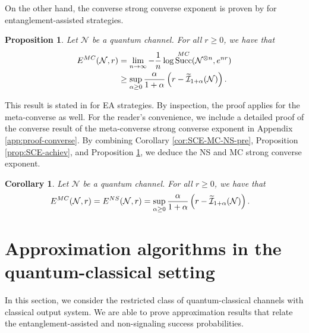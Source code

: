 \documentclass[a4paper,onecolumn,11pt,accepted=2025-10-01]{quantumarticle}
\newtheorem{prop}[theorem]{Proposition}
\newtheorem{cor}[theorem]{Corollary}
\DeclareMathOperator{\suc}{Succ}
\newcommand*{\cI}{\mathcal{I}}
\newcommand*{\cN}{\mathcal{N}}
\begin{document}
On the other hand, the converse strong converse exponent is proven by \cite{Gupta2015Mar} for entanglement-assisted strategies.

\begin{prop}\label{prop:SCE-converse}
     Let  $\cN$ be a quantum channel. For all $r\ge 0$, we have  that
 \begin{align}
     E^{\rm{MC}}(\cN, r) &= \lim_{n\rightarrow \infty } - \frac{1}{n}\log \suc^{\rm{MC}}(\cN^{\otimes n}, e^{nr})  
     \\&\ge \sup_{\alpha\ge 0}  \frac{\alpha}{1+\alpha}\left( r- \widetilde{\cI}_{1+\alpha}(\cN) \right). 
    \end{align}
\end{prop}

This result is stated in \cite{Gupta2015Mar} for EA strategies. By inspection, the proof applies for the meta-converse as well. For the reader's convenience, we include a detailed proof of the converse result of the  meta-converse  strong converse exponent  in Appendix \ref{app:proof-converse}. By combining Corollary \ref{cor:SCE-MC-NS-pre}, Proposition \ref{prop:SCE-achiev}, and Proposition \ref{prop:SCE-converse}, we deduce the  NS and MC strong converse  exponent.

\begin{cor}\label{cor:SCE-MC-NS}
Let $\cN$ be a quantum channel. For all $r\ge 0$, we have  that 
 \begin{align}
     E^{\rm{MC}}(\cN, r) &= E^{\rm{NS}}(\cN, r)
     =\sup_{\alpha\ge 0}  \frac{\alpha}{1+\alpha}\left( r- \widetilde{\cI}_{1+\alpha}(\cN) \right). 
    \end{align}
\end{cor}


\section{Approximation algorithms in the quantum-classical setting}\label{sec:qc}

In this section, we consider the restricted class of quantum-classical channels with classical output system.  We are able to prove approximation results that relate the entanglement-assisted and non-signaling success probabilities.
\end{document}

